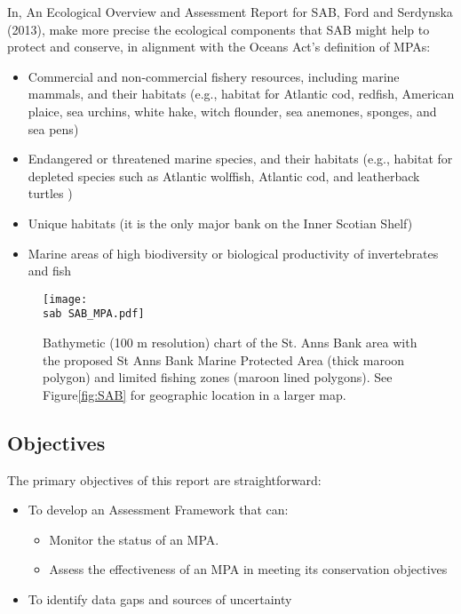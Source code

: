 \documentclass[letterpaper,portrait,11pt]{scrartcl}
\numberwithin{equation}{section}		%
\numberwithin{figure}{section}		%
\numberwithin{table}{section}				%
\newcommand{\ecomod}{\string~/ecomod_data/}   %
\newcommand{\sab}{\ecomod/mpa/sab/}   %
\newcommand{\analysis}{\ecomod/mpa/analysis/}   %
\begin{document}
In, An Ecological Overview and Assessment Report for SAB, Ford and Serdynska (2013), make more precise the ecological components that SAB might help to protect and conserve, in alignment with the Oceans Act's definition of MPAs:

\begin{itemize}
	\item Commercial and non-commercial fishery resources, including marine mammals, and their habitats (e.g., habitat for Atlantic cod, redfish, American plaice, sea urchins, white hake, witch flounder, sea anemones, sponges, and sea pens)
  \item Endangered or threatened marine species, and their habitats (e.g., habitat for depleted species such as Atlantic wolffish, Atlantic cod, and leatherback turtles )
  \item Unique habitats (it is the only major bank on the Inner Scotian Shelf)
  \item Marine areas of high biodiversity or biological productivity of invertebrates and fish
\end{itemize}

\begin{figure}[h]
  \label{fig:SABCloseup}
  \centering
  \texttt{[image: \\sab SAB\_MPA.pdf]}
  \caption{Bathymetic (100 m resolution) chart of the  St. Anns Bank area with the proposed St Anns Bank Marine Protected Area (thick maroon polygon) and limited fishing zones (maroon lined polygons). See Figure\ref{fig:SAB} for geographic location in a larger map.}
\end{figure}

\subsection{Objectives}

The primary objectives of this report are straightforward:

\begin{itemize}
	\item To develop an Assessment Framework that can:
  \begin{itemize}
    \item	Monitor the status of an MPA.
  	\item Assess the effectiveness of an MPA in meeting its conservation objectives
  \end{itemize}
  \item To identify data gaps and sources of uncertainty 
\end{itemize}
\end{document}
